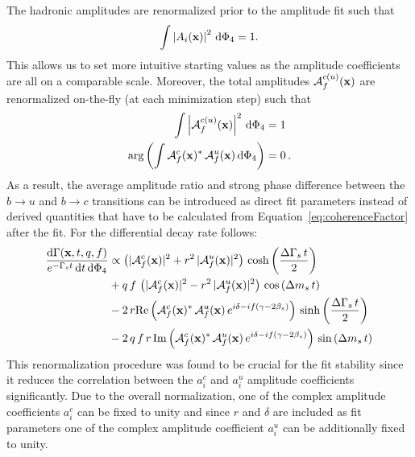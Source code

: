 The hadronic amplitudes are renormalized prior to the amplitude fit such that 
\begin{equation}
	\int  \left\vert   A_{i}(\mathbf{x}) \right\vert^{2} \, \mathrm{d}\Phi_4= 1 .
\end{equation}
This allows us to set more intuitive starting values as the amplitude coefficients are all on a comparable scale.
Moreover, the total amplitudes $\mathcal A^{c(u)}_{f}(\mathbf{x})$ are renormalized on-the-fly (\ie at each minimization step) such that
\begin{align}
	\nonumber 
	\int  \left\vert  \mathcal A^{c(u)}_{f}(\mathbf{x}) \right\vert^{2} \, \mathrm{d}\Phi_4  & = 1  \\
	\text{arg}\left( \int \mathcal A^{c}_{f}(\mathbf{x})^* \, \mathcal A^{u}_{f}(\mathbf{x}) \, \mathrm{d}\Phi_4 \right) & = 0    \,.
\end{align}
As a result, the average amplitude ratio and strong phase difference between the $b\to u$ and $b\to c$ transitions can be introduced as direct fit parameters 
instead of derived quantities that have to be calculated from Equation~\ref{eq:coherenceFactor}
after the fit.
For the differential decay rate follows:
\begin{equation}
\begin{split}
\label{eq:PDF_full2}
	\frac{\text{d}\Gamma(\mathbf{x},t,q,f)}{ e^{- \Gamma_s t} \, \text{d}t \, \text{d}\Phi_4} &\propto  
	 \left( \vert \mathcal A^c_{f}(\mathbf{x}) \vert^2 + r^2 \, \vert \mathcal A^u_{f}(\mathbf{x}) \vert^2 \right) \, \text{cosh} \left( \frac{\Delta \Gamma_s \, t}{2}\right) \\
	 & + q \, f \,  \left( \vert \mathcal A^c_{f}(\mathbf{x}) \vert^2 - r^2 \, \vert \mathcal A^u_{f}(\mathbf{x})  \vert^2 \right) \, \text{cos} \left(\Delta m_s \, t \right)  \\
	 & -2 \, r \text{Re}\left( \mathcal A^c_{f}(\mathbf{x})^{*}  \, \mathcal A^u_{f}(\mathbf{x})  \, e^{i \delta - i f (\gamma - 2\beta_s)}  \right) \, \text{sinh} \left( \frac{\Delta \Gamma_s \, t}{2}\right)  \\
	 & -2 \, q \, f \, r \,  \text{Im}\left( \mathcal A^c_{f}(\mathbf{x})^{*} \, \mathcal A^u_{f}(\mathbf{x})  \, e^{i \delta -i f (\gamma - 2\beta_s)}  \right)\, \text{sin} \left(\Delta m_s \, t \right)  
\end{split}
\end{equation}
This renormalization procedure was found to be crucial for the fit stability since it reduces the correlation between the $a_i^c$ and $a_i^u$ amplitude coefficients significantly.
Due to the overall normalization, one of the complex amplitude coefficients $a_i^c$ can be fixed to unity 
and since $r$ and $\delta$ are included as fit parameters one of the complex amplitude coefficient $a_i^u$ can be additionally fixed to unity.

